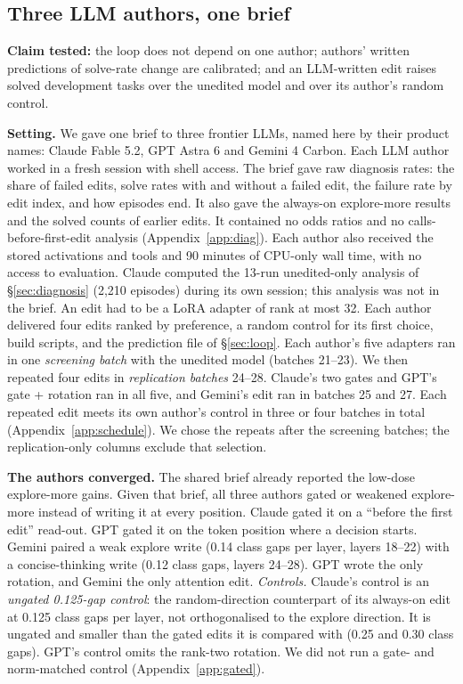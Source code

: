 \subsection{Three LLM authors, one brief}
\label{sec:arena}
\textbf{Claim tested:} the loop does not depend on one author; authors' written predictions of solve-rate change are calibrated; and an LLM-written edit raises solved development tasks over the unedited model and over its author's random control.

\textbf{Setting.} We gave one brief to three frontier LLMs, named here by their product names: Claude Fable 5.2, GPT Astra 6 and Gemini 4 Carbon. Each LLM author worked in a fresh session with shell access. The brief gave raw diagnosis rates: the share of failed edits, solve rates with and without a failed edit, the failure rate by edit index, and how episodes end. It also gave the always-on explore-more results and the solved counts of earlier edits. It contained no odds ratios and no calls-before-first-edit analysis (Appendix~\ref{app:diag}). Each author also received the stored activations and tools and 90 minutes of CPU-only wall time, with no access to evaluation. Claude computed the 13-run unedited-only analysis of \S\ref{sec:diagnosis} (2,210 episodes) during its own session; this analysis was not in the brief. An edit had to be a LoRA adapter of rank at most 32. Each author delivered four edits ranked by preference, a random control for its first choice, build scripts, and the prediction file of \S\ref{sec:loop}. Each author's five adapters ran in one \emph{screening batch} with the unedited model (batches 21--23). We then repeated four edits in \emph{replication batches} 24--28. Claude's two gates and GPT's gate + rotation ran in all five, and Gemini's edit ran in batches 25 and 27. Each repeated edit meets its own author's control in three or four batches in total (Appendix~\ref{app:schedule}). We chose the repeats after the screening batches; the replication-only columns exclude that selection.

\textbf{The authors converged.} The shared brief already reported the low-dose explore-more gains. Given that brief, all three authors gated or weakened explore-more instead of writing it at every position. Claude gated it on a ``before the first edit'' read-out. GPT gated it on the token position where a decision starts. Gemini paired a weak explore write (0.14 class gaps per layer, layers 18--22) with a concise-thinking write (0.12 class gaps, layers 24--28). GPT wrote the only rotation, and Gemini the only attention edit. \emph{Controls.} Claude's control is an \emph{ungated 0.125-gap control}: the random-direction counterpart of its always-on edit at 0.125 class gaps per layer, not orthogonalised to the explore direction. It is ungated and smaller than the gated edits it is compared with (0.25 and 0.30 class gaps). GPT's control omits the rank-two rotation. We did not run a gate- and norm-matched control (Appendix~\ref{app:gated}).

